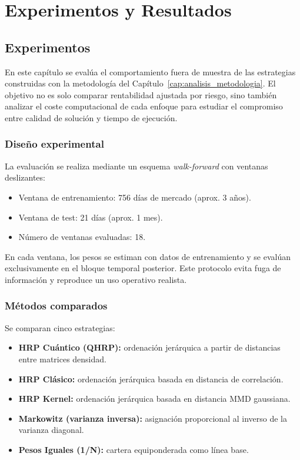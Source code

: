 \chapter{Experimentos y Resultados}
\label{cap:experimentos_resultados}

\section{Experimentos}
\label{sec:experimentos}
En este capítulo se evalúa el comportamiento fuera de muestra de las estrategias construidas con la metodología del Capítulo~\ref{cap:analisis_metodologia}. El objetivo no es solo comparar rentabilidad ajustada por riesgo, sino también analizar el coste computacional de cada enfoque para estudiar el compromiso entre calidad de solución y tiempo de ejecución.

\subsection{Diseño experimental}
La evaluación se realiza mediante un esquema \textit{walk-forward} con ventanas deslizantes:

\begin{itemize}
	\item Ventana de entrenamiento: 756 días de mercado (aprox. 3 años).
	\item Ventana de test: 21 días (aprox. 1 mes).
	\item Número de ventanas evaluadas: 18.
\end{itemize}

En cada ventana, los pesos se estiman con datos de entrenamiento y se evalúan exclusivamente en el bloque temporal posterior. Este protocolo evita fuga de información y reproduce un uso operativo realista.

\subsection{Métodos comparados}
Se comparan cinco estrategias:

\begin{itemize}
	\item \textbf{HRP Cuántico (QHRP):} ordenación jerárquica a partir de distancias entre matrices densidad.
	\item \textbf{HRP Clásico:} ordenación jerárquica basada en distancia de correlación.
	\item \textbf{HRP Kernel:} ordenación jerárquica basada en distancia MMD gaussiana.
	\item \textbf{Markowitz (varianza inversa):} asignación proporcional al inverso de la varianza diagonal.
	\item \textbf{Pesos Iguales (1/N):} cartera equiponderada como línea base.
\end{itemize}

